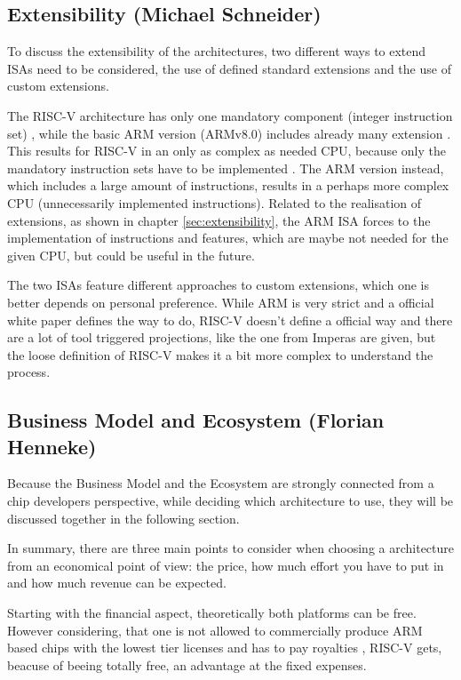\documentclass[conference]{IEEEtran}
\begin{document}
\subsection{Extensibility (Michael Schneider)} \label{dis:Extensibility}
	To discuss the extensibility of the architectures, two different ways to extend \glspl{ISA} need to be considered, the use of defined standard extensions and the use of custom extensions. 
	
	The RISC-V architecture has only one mandatory component (integer instruction set) \cite[page 3f]{Waterman2017}, while the basic ARM version (ARMv8.0) includes already many extension \cite[page 8120] {Arm2020}. This results for RISC-V in an only as complex as needed CPU, because only the mandatory instruction sets have to be implemented \cite[page 3f]{Waterman2017}. The ARM version instead, which includes a large amount of instructions, results in a perhaps more complex CPU (unnecessarily implemented instructions). Related to the realisation of extensions, as shown in chapter \ref{sec:extensibility}, the ARM \gls{ISA} forces to the implementation of instructions and features, which are maybe not needed for the given CPU, but could be useful in the future.

	The two \glspl{ISA} feature different approaches to custom extensions, which one is better depends on personal preference. While ARM is very strict and a official white paper \cite{LauranneChoquin2020} defines the way to do, RISC-V doesn't define a official way and there are a lot of tool triggered projections, like the one from Imperas \cite{Limited2019} are given, but the loose definition of RISC-V makes it a bit more complex to understand the process.

	\subsection{Business Model and Ecosystem (Florian Henneke)}
	Because the Business Model and the Ecosystem are strongly connected from a chip developers perspective, while deciding which architecture to use, they will be discussed together in the following section.

	In summary, there are three main points to consider when choosing a architecture from an economical point of view: the price, how much effort you have to put in and how much revenue can be expected.

	Starting with the financial aspect, theoretically both platforms can be free. However considering, that one is not allowed to commercially produce ARM based chips with the lowest tier licenses and has to pay royalties \cite{ARMLC}, RISC-V gets, beacuse of beeing totally free, an advantage at the fixed expenses.
\end{document}
